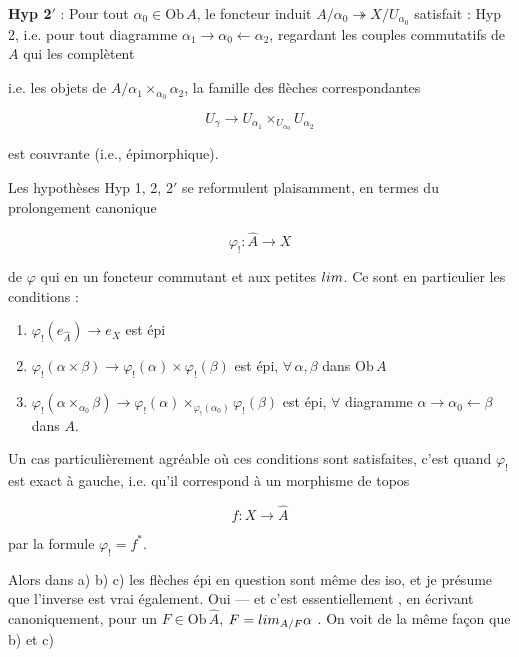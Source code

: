 \documentclass[11pt,a4paper]{article}
\begin{document}
\textbf{Hyp 2${}'$} : Pour tout $\alpha_0 \in \mathrm{Ob}\,A$, le
foncteur induit $A/\alpha_0 \twoheadrightarrow X/U_{\alpha_0}$ satisfait :
Hyp 2, i.e. pour tout diagramme $\alpha_1 \to \alpha_0 \leftarrow \alpha_2$,
regardant les couples commutatifs de $A$ qui les complètent


i.e. les objets de $A/\alpha_1\times_{\alpha_0}\alpha_2$, la famille des flèches
correspondantes

\[
  U_\gamma \longrightarrow U_{\alpha_1} \times_{U_{\alpha_0}} U_{\alpha_2}
\]

est couvrante (i.e., épimorphique).

Les hypothèses Hyp 1, 2, 2${}'$ se reformulent plaisamment, en termes du
prolongement canonique

\[
  \varphi_! \colon \widehat{A} \longrightarrow X
\]

de $\varphi$ qui en un foncteur  commutant et aux
petites $\varinjlim$. Ce sont en particulier   les conditions :

\begin{enumerate}
  \item[a)] $\varphi_!(e_{\widehat{A}}) \longrightarrow e_X$ est épi
  \item[b)] $\varphi_!(\alpha\times\beta) \longrightarrow \varphi_!(\alpha)\times\varphi_!(\beta)$ est épi, $\forall\,\alpha,\beta$ dans $\mathrm{Ob}\,A$
  \item[c)] $\varphi_!(\alpha\times_{\alpha_0}\beta) \longrightarrow \varphi_!(\alpha)\times_{\varphi_!(\alpha_0)}\varphi_!(\beta)$ est épi, $\forall$ diagramme $\alpha \to \alpha_0 \leftarrow \beta$ dans $A$.
\end{enumerate}

Un cas particulièrement agréable où ces conditions sont satisfaites, c'est quand
$\varphi_!$ est exact à gauche, i.e. qu'il correspond \struck{\ill}
à un morphisme de topos

\[
  f \colon X \longrightarrow \widehat{A}
\]

par la formule $\varphi_! = f^*$.

Alors dans a) b) c) les flèches épi en question sont même des iso, et
je présume que l'inverse est vrai également. Oui — et c'est
essentiellement , en écrivant canoniquement, pour un
$F \in \mathrm{Ob}\,\widehat{A}$, $F = \varinjlim_{A/F}\alpha$ \ill.
On voit  de la même façon que b) et c)
\end{document}
